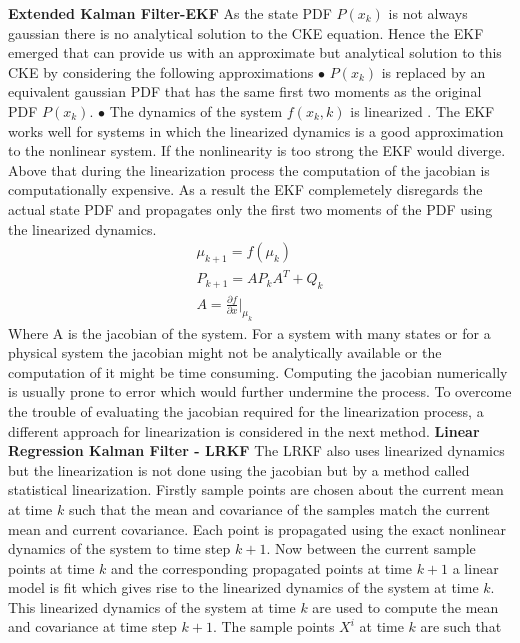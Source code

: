 \documentclass{article}
\begin{document}
	\newline\newline
	{\bf Extended Kalman Filter-EKF}\newline\newline
	As the state PDF $P(x_k)$ is not always gaussian there is no analytical solution to the CKE equation. Hence the EKF emerged that can provide us with an approximate but analytical solution to this CKE by considering the following approximations\newline\newline
	$\bullet$ $P(x_k)$ is replaced by an equivalent gaussian PDF that has the same first two moments as the original PDF $P(x_k)$.\newline\newline
	$\bullet$ The dynamics of the system $f(x_k,k)$ is linearized .\newline\newline
	The EKF works well for systems in which the linearized dynamics is a good approximation to the nonlinear system. If the nonlinearity is too strong the EKF would diverge. Above that during the linearization process the computation of the jacobian is computationally expensive. As a result the EKF complemetely disregards the actual state PDF and propagates only the first two moments of the PDF using the linearized dynamics.
\begin{align}
\mu_{k+1}=f(\mu_k)\\
P_{k+1}=AP_kA^T+Q_k\\
A=\frac{\partial{f}}{\partial{x}}|_{\mu_k}
\end{align}
Where A is the jacobian of the system. For a system with many states or for a physical system the jacobian might not be analytically available or the computation of it might be time consuming. Computing the jacobian numerically is usually prone to error which would further undermine the process. To overcome the trouble of evaluating the jacobian required for the linearization process, a different approach for linearization is considered in the next method. \newline\newline
 {\bf Linear Regression Kalman Filter - LRKF}\newline \newline
	The LRKF also uses linearized dynamics but the linearization is not done using the jacobian but by a method called statistical linearization. Firstly sample points are chosen about the current mean at time $k$ such that the mean and covariance of the samples match the current mean and current covariance. Each point is propagated using the exact nonlinear dynamics of the system to time step $k+1$. Now between the current sample points at time $k$ and the corresponding propagated points at time $k+1$ a linear model is fit which gives rise to the linearized dynamics of the system at time $k$. This linearized dynamics of the system at time $k$ are used to compute the mean and covariance at time step $k+1$. The sample points $X^i$ at time $k$  are such that
\end{document}
